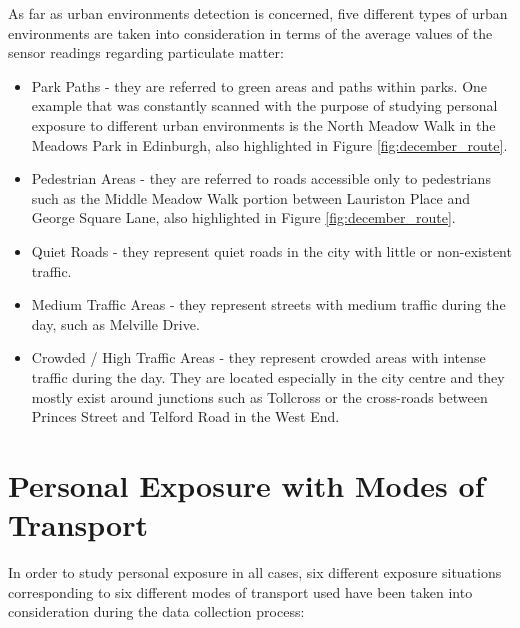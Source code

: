 \documentclass[bsc,frontabs,twoside,singlespacing, parskip,deptreport]{infthesis}     %
\begin{document}
As far as urban environments detection is concerned, five different types of urban environments are taken into consideration in terms of the average values of the sensor readings regarding particulate matter:

\begin{itemize}
\item Park Paths - they are referred to green areas and paths within parks. One example that was constantly scanned with the purpose of studying personal exposure to different urban environments is the North Meadow Walk in the Meadows Park in Edinburgh, also highlighted in Figure \ref{fig:december_route}.

\item Pedestrian Areas - they are referred to roads accessible only to pedestrians such as the Middle Meadow Walk portion between Lauriston Place and George Square Lane, also highlighted in Figure \ref{fig:december_route}.

\item Quiet Roads - they represent quiet roads in the city with little or non-existent traffic.

\item Medium Traffic Areas - they represent streets with medium traffic during the day, such as Melville Drive.

\item Crowded / High Traffic Areas - they represent crowded areas with intense traffic during the day. They are located especially in the city centre and they mostly exist around junctions such as Tollcross or the cross-roads between Princes Street and Telford Road in the West End. 
\end{itemize}
\label{list:urban-environments}

\section{Personal Exposure with Modes of Transport}

In order to study personal exposure in all cases, six different exposure situations corresponding to six different modes of transport used have been taken into consideration during the data collection process:
\end{document}
